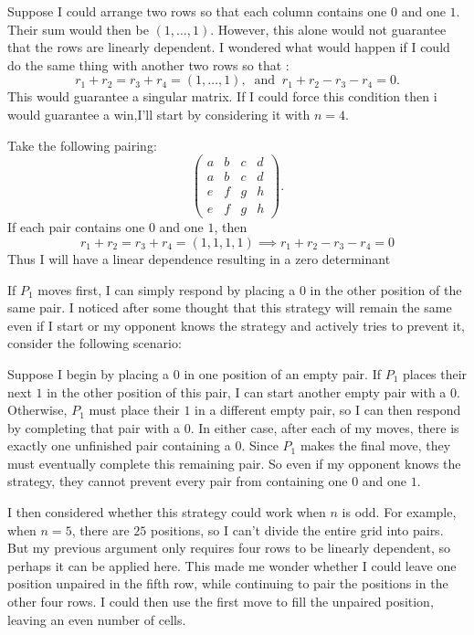 \documentclass[11pt]{article}
\newcommand{\keywordfont}{\textsc}
\newcommand{\keyword}[1]{%
  \marginpar{\raggedright\small\keywordfont{#1}}}
\begin{document}
Suppose I could arrange two rows
so that each column contains one
$0$ and one $1$. Their sum would
then be $(1,\ldots,1)$.
However, this alone would not
guarantee that the rows are
linearly dependent.
I wondered what would happen if
I could do the same thing with
another two rows so that :
$$ r_1+r_2=r_3+r_4=(1,\ldots,1),\;\;\text{and}\;\;
 r_1+r_2-r_3-r_4=0.$$
This would guarantee a singular
matrix. If I could force this
condition then i would guarantee a win,I'll start by considering it with $n=4$.


 Take the following pairing:
$$
\begin{pmatrix}
a&b&c&d\\
a&b&c&d\\
e&f&g&h\\
e&f&g&h
\end{pmatrix}.
$$
If each pair contains one $0$ and one $1$, then
$$ r_1+r_2=r_3+r_4=(1,1,1,1) \implies r_1+r_2-r_3-r_4=0$$ Thus  I will have a linear dependence resulting in a zero determinant

\medskip
\keyword{CHECK}
If $P_1$ moves first, I can simply respond by placing a $0$ in the other position of the same pair. I noticed after some thought that this strategy will remain the same even if I start or my opponent knows the strategy and actively tries to prevent it, consider the following scenario:

Suppose I begin by placing a $0$ in one position of an empty pair. If $P_1$ places their next $1$ in the other position of this
pair, I can start another empty pair with a $0$. Otherwise, $P_1$ must place their
$1$ in a different empty pair,
so I can then respond by completing
that pair with a $0$. In either case, after each of my moves, there is exactly one unfinished pair containing a $0$. Since $P_1$ makes the final move, they must eventually complete this remaining pair.
So even if my opponent knows the strategy, they cannot prevent every pair from containing one $0$ and one $1$.

\medskip
\keyword{I WONDER}
I then considered whether this strategy could work when $n$ is odd. For example, when $n=5$, there are $25$ positions, so I can't divide the entire grid into pairs. But my previous argument only requires four rows to be linearly dependent, so perhaps it can be applied here. This made me wonder whether I could leave one position unpaired in the fifth row, while continuing to pair the positions in the other four rows. I could then use the first move to fill the unpaired position, leaving an even number of cells.
\end{document}
